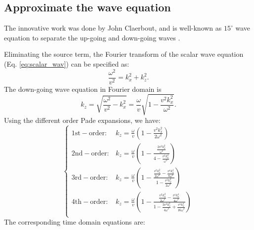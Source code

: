 \subsection{Approximate the wave equation}

The innovative work was done by John Claerbout, and is well-known as $15^{\circ}$ wave equation to separate the up-going and down-going waves \citep{claerbout1971toward,claerbout1986imaging}.

Eliminating the source term, the Fourier transform of the scalar wave equation (Eq. \eqref{eq:scalar_wav}) can be specified as:
\begin{equation}
\frac{\omega^2}{v^2}=k_x^2+k_z^2.
\end{equation}
The down-going wave equation in Fourier domain is
\begin{equation}
k_z=\sqrt{\frac{\omega^2}{v^2}-k_x^2}=\frac{\omega}{v}\sqrt{1-\frac{v^2k_x^2}{\omega^2}}.
\end{equation}
Using the different order Pade expansions, we have:
\begin{equation}\left\{
\begin{split}
\mathrm{1st-order:} &k_z=\frac{\omega}{v}\left(1-\frac{v^2k_x^2}{2\omega^2}\right)\\
\mathrm{2nd-order:} &k_z=\frac{\omega}{v}\left(1-\frac{\frac{2v^2k_x^2}{\omega^2}}{4-\frac{v^2k_x^2}{\omega^2}}\right)\\
\mathrm{3rd-order:} &k_z=\frac{\omega}{v}\left(1-\frac{\frac{v^2k_x^2}{2\omega^2}-\frac{v^4 k_x^4}{8\omega^4}}{1-\frac{v^2k_x^2}{2\omega^2}}\right)\\
\mathrm{4th-order:} &k_z=\frac{\omega}{v}\left(1-\frac{\frac{v^2k_x^2}{2\omega^2}-\frac{v^4 k_x^4}{4\omega^4}}{1-\frac{3v^2k_x^2}{4\omega^2}+\frac{v^4k_x^4}{16\omega^4}}\right)\\
\end{split}\right.
\end{equation}
The corresponding time domain equations are:
